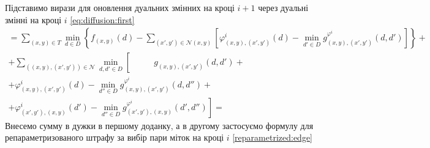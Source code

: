 Підставимо вирази для оновлення дуальних змінних на кроці $i + 1$
через дуальні змінні на кроці $i$ \eqref{eq:diffusion:first}
\begin{equation*}
\begin{gathered}
    = \sum \limits_{\left(x, y \right) \in T}
        \min \limits_{d \in D} \left\{
            f_{ \left(x, y \right)} \left(d \right) -
            \sum \limits_{\left(x', y' \right) \in \mathcal{N} \left(x, y \right)}
            \left[
                \varphi_{ \left(x, y \right), \left(x', y' \right)}^i
                    \left(d \right) -
                \min \limits_{d' \in D}
                    g_{\left(x, y \right), \left(x', y' \right)}^{\varphi^i}
                        \left( d, d' \right)
            \right]
        \right\} + \\
    + \sum \limits_{\left(\left(x, y \right), \left(x', y' \right) \right) \in \mathcal{N}}
        \min \limits_{d, d' \in D} \left[ \phantom{\min \limits_{d'' \in D}}
            g_{\left(x, y \right), \left(x', y' \right)} \left(d, d' \right) + \right. \\
            + \varphi_{\left(x, y \right), \left(x', y' \right)}^i
                \left(d \right) -
            \min \limits_{d'' \in D}
                g_{\left(x, y \right), \left(x', y' \right)}^{\varphi^i}
                    \left(d, d'' \right) + \\
            \left. + \varphi_{\left(x', y' \right), \left(x, y \right)}^i
                \left(d' \right) -
            \min \limits_{d'' \in D}
                g_{\left(x', y' \right), \left(x, y \right)}^{\varphi^i}
                    \left(d', d'' \right)
        \right] =
\end{gathered}
\end{equation*}
Внесемо сумму в дужки в першому доданку,
а в другому застосуємо формулу для репараметризованого
штрафу за вибір пари міток на кроці $i$ \eqref{reparametrized:edge}
